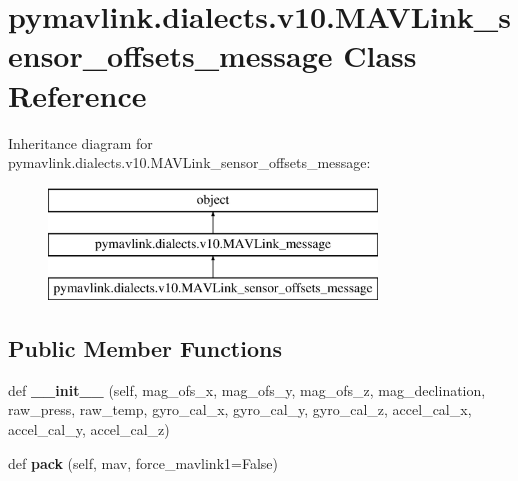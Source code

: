 \hypertarget{classpymavlink_1_1dialects_1_1v10_1_1MAVLink__sensor__offsets__message}{}\section{pymavlink.\+dialects.\+v10.\+M\+A\+V\+Link\+\_\+sensor\+\_\+offsets\+\_\+message Class Reference}
\label{classpymavlink_1_1dialects_1_1v10_1_1MAVLink__sensor__offsets__message}
Inheritance diagram for pymavlink.\+dialects.\+v10.\+M\+A\+V\+Link\+\_\+sensor\+\_\+offsets\+\_\+message\+:\begin{figure}[H]
\begin{center}
\leavevmode
\includegraphics[height=3.000000cm]{classpymavlink_1_1dialects_1_1v10_1_1MAVLink__sensor__offsets__message}
\end{center}
\end{figure}
\subsection*{Public Member Functions}
\begin{DoxyCompactItemize}
\item 
\mbox{\label{classpymavlink_1_1dialects_1_1v10_1_1MAVLink__sensor__offsets__message_a995abbc10eeac0eabef174631c0f557c}} 
def {\bfseries \+\_\+\+\_\+init\+\_\+\+\_\+} (self, mag\+\_\+ofs\+\_\+x, mag\+\_\+ofs\+\_\+y, mag\+\_\+ofs\+\_\+z, mag\+\_\+declination, raw\+\_\+press, raw\+\_\+temp, gyro\+\_\+cal\+\_\+x, gyro\+\_\+cal\+\_\+y, gyro\+\_\+cal\+\_\+z, accel\+\_\+cal\+\_\+x, accel\+\_\+cal\+\_\+y, accel\+\_\+cal\+\_\+z)
\item 
\mbox{\label{classpymavlink_1_1dialects_1_1v10_1_1MAVLink__sensor__offsets__message_a8216564c6e5cea0719cc01736e19d584}} 
def {\bfseries pack} (self, mav, force\+\_\+mavlink1=False)
\end{DoxyCompactItemize}
